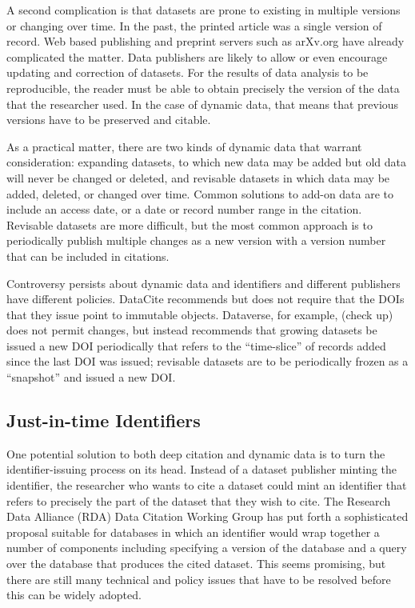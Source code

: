\documentclass[10pt,a4paper,twocolumn]{article}
\begin{document}
A second complication is that datasets are prone to existing in multiple versions or changing over time. 
In the past, the printed article was a single version of record.
Web based publishing and preprint servers such as arXv.org have already complicated the matter. 
Data publishers are likely to allow or even encourage updating and correction of datasets. 
For the results of data analysis to be reproducible, the reader must be able to obtain precisely the version of the data that the researcher used. 
In the case of dynamic data, that means that previous versions have to be preserved and citable.

As a practical matter, there are two kinds of dynamic data that warrant consideration: expanding datasets, to which new data may be added but old data will never be changed or deleted, and revisable datasets in which data may be added, deleted, or changed over time. 
Common solutions to add-on data are to include an access date, or a date or record number range in the citation. 
Revisable datasets are more difficult, but the most common approach is to periodically publish multiple changes as a new version with a version number that can be included in citations.

Controversy persists about dynamic data and identifiers and different publishers have different policies. 
DataCite recommends but does not require that the DOIs that they issue point to immutable objects. 
Dataverse, for example, (check up) does not permit changes, but instead recommends that growing datasets be issued a new DOI periodically that refers to the ``time-slice'' of records added since the last DOI was issued; revisable datasets are to be periodically frozen as a ``snapshot'' and issued a new DOI.

\subsection*{Just-in-time Identifiers}\label{just-in-time-identifiers}

One potential solution to both deep citation and dynamic data is to turn the identifier-issuing process on its head. 
Instead of a dataset publisher minting the identifier, the researcher who wants to cite a dataset could mint an identifier that refers to precisely the part of the dataset that they wish to cite. 
The Research Data Alliance (RDA) Data Citation Working Group has put forth a sophisticated proposal suitable for databases in which an identifier would wrap together a number of components including specifying a version of the database and a query over the database that produces the cited dataset. 
This seems promising, but there are still many technical and policy issues that have to be resolved before this can be widely adopted.
\end{document}
